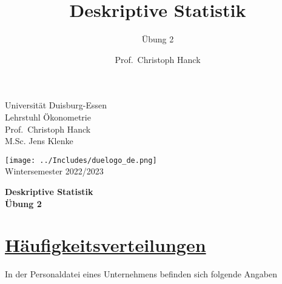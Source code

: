 \documentclass[12pt,a4paper]{article}
\title{Deskriptive Statistik}
\subtitle{Übung 2}
\author{Prof.~Christoph Hanck}
\date{}
\newcommand{\tmpsection}[1]{}
\let\tmpsection=\section
\renewcommand{\section}[1]{\tmpsection{\underline{#1}} }
\begin{document}





\restoregeometry



\begin{minipage}{0.6\textwidth}
Universität Duisburg-Essen\\
Lehrstuhl Ökonometrie\\
Prof.~Christoph Hanck \\
M.Sc. Jens Klenke \\
\end{minipage}

	\begin{flushright}
	\vspace{-3.55cm}
	\texttt{[image: ../Includes/duelogo\_de.png]}\\
	\vspace{.125cm}
	Wintersemester 2022/2023
	\end{flushright}


\begin{center}
	\vspace{.25cm}
	\textbf{\Large{Deskriptive Statistik}}\\
	\vspace{.25cm}
	\textbf{\large{Übung 2}}\\
	\vspace{.125cm}
\end{center}





\hypertarget{huxe4ufigkeitsverteilungen}{%
\section{Häufigkeitsverteilungen}\label{huxe4ufigkeitsverteilungen}}

In der Personaldatei eines Unternehmens befinden sich folgende Angaben
\end{document}
